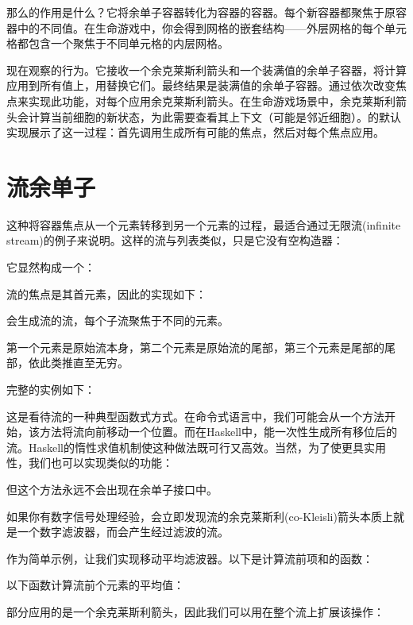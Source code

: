 那么的作用是什么？它将余单子容器转化为容器的容器。每个新容器都聚焦于原容器中的不同值。在生命游戏中，你会得到网格的嵌套结构——外层网格的每个单元格都包含一个聚焦于不同单元格的内层网格。

现在观察的行为。它接收一个余克莱斯利箭头和一个装满值的余单子容器，将计算应用到所有值上，用替换它们。最终结果是装满值的余单子容器。通过依次改变焦点来实现此功能，对每个应用余克莱斯利箭头。在生命游戏场景中，余克莱斯利箭头会计算当前细胞的新状态，为此需要查看其上下文（可能是邻近细胞）。的默认实现展示了这一过程：首先调用生成所有可能的焦点，然后对每个焦点应用。

\section{流余单子}

这种将容器焦点从一个元素转移到另一个元素的过程，最适合通过无限流(infinite stream)的例子来说明。这样的流与列表类似，只是它没有空构造器：

它显然构成一个：

流的焦点是其首元素，因此的实现如下：

会生成流的流，每个子流聚焦于不同的元素。

第一个元素是原始流本身，第二个元素是原始流的尾部，第三个元素是尾部的尾部，依此类推直至无穷。

完整的实例如下：

这是看待流的一种典型函数式方式。在命令式语言中，我们可能会从一个方法开始，该方法将流向前移动一个位置。而在Haskell中，能一次性生成所有移位后的流。Haskell的惰性求值机制使这种做法既可行又高效。当然，为了使更具实用性，我们也可以实现类似的功能：

但这个方法永远不会出现在余单子接口中。

如果你有数字信号处理经验，会立即发现流的余克莱斯利(co-Kleisli)箭头本质上就是一个数字滤波器，而会产生经过滤波的流。

作为简单示例，让我们实现移动平均滤波器。以下是计算流前项和的函数：

以下函数计算流前个元素的平均值：

部分应用的是一个余克莱斯利箭头，因此我们可以用在整个流上扩展该操作：

